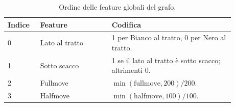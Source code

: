 \begin{table}[H]
\centering
\small
\caption{Ordine delle feature globali del grafo.}
\label{tab:global-features}
\begin{tabular}{p{0.12\linewidth}p{0.28\linewidth}p{0.48\linewidth}}
\toprule
Indice & Feature & Codifica \\
\midrule
0 & Lato al tratto & 1 per Bianco al tratto, 0 per Nero al tratto. \\
1 & Sotto scacco & 1 se il lato al tratto è sotto scacco; altrimenti 0. \\
2 & Fullmove & \(\min(\text{fullmove},200)/200\). \\
3 & Halfmove & \(\min(\text{halfmove},100)/100\). \\
\bottomrule
\end{tabular}
\end{table}
